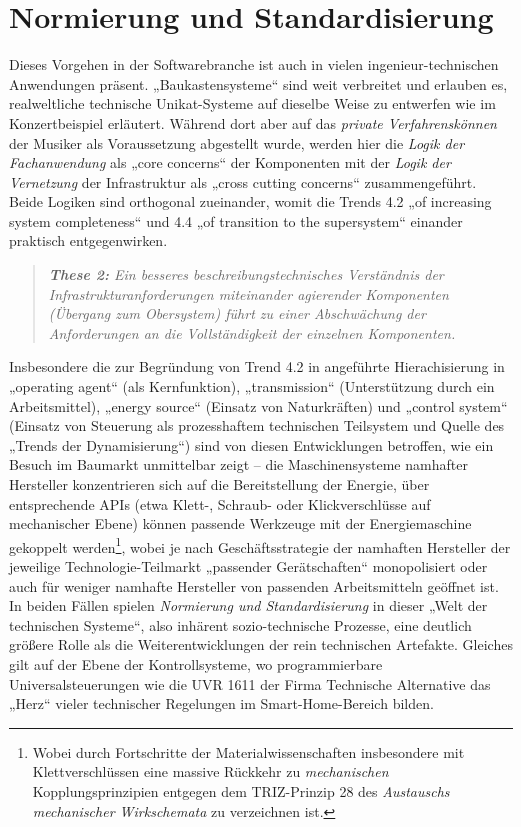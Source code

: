 \documentclass[11pt,a4paper]{article}
\begin{document}
\section{Normierung und Standardisierung}

Dieses Vorgehen in der Softwarebranche ist auch in vielen
ingenieur-technischen Anwendungen präsent. „Baukastensysteme“ sind weit
verbreitet und erlauben es, realweltliche technische Unikat-Systeme auf
dieselbe Weise zu entwerfen wie im Konzertbeispiel erläutert. Während dort
aber auf das \emph{private Verfahrenskönnen} der Musiker als Voraussetzung
abgestellt wurde, werden hier die \emph{Logik der Fachanwendung} als „core
concerns“ der Komponenten mit der \emph{Logik der Vernetzung} der
Infrastruktur als „cross cutting concerns“ zusammengeführt. Beide Logiken sind
orthogonal zueinander, womit die Trends 4.2 „of increasing system
completeness“ und 4.4 „of transition to the supersystem“ einander praktisch
entgegenwirken. 
\begin{quote}\it 
  \textbf{These 2:} Ein besseres beschreibungstechnisches Verständnis der
  Infrastrukturanforderungen miteinander agierender Komponenten (Übergang zum
  Obersystem) führt zu einer \emph{Abschwächung} der Anforderungen an die
  Vollständigkeit der einzelnen Komponenten.
\end{quote}
Insbesondere die zur Begründung von Trend 4.2 in \cite{TESE2018} angeführte
Hierachisierung in „operating agent“ (als Kernfunktion), „transmission“
(Unterstützung durch ein Arbeitsmittel), „energy source“ (Einsatz von
Naturkräften) und „control system“ (Einsatz von Steuerung als prozesshaftem
technischen Teilsystem und Quelle des „Trends der Dynamisierung“) sind von
diesen Entwicklungen betroffen, wie ein Besuch im Baumarkt unmittelbar zeigt
-- die Maschinensysteme namhafter Hersteller konzentrieren sich auf die
Bereitstellung der Energie, über entsprechende APIs (etwa Klett-, Schraub-
oder Klickverschlüsse auf mechanischer Ebene) können passende Werkzeuge mit
der Energiemaschine gekoppelt werden\footnote{Wobei durch Fortschritte der
  Materialwissenschaften insbesondere mit Klettverschlüssen eine massive
  Rückkehr zu \emph{mechanischen} Kopplungsprinzipien entgegen dem
  TRIZ-Prinzip 28 des \emph{Austauschs mechanischer Wirkschemata} zu
  verzeichnen ist.}, wobei je nach Geschäftsstrategie der namhaften Hersteller
der jeweilige Technologie-Teilmarkt „passender Gerätschaften“ monopolisiert
oder auch für weniger namhafte Hersteller von passenden Arbeitsmitteln
geöffnet ist. In beiden Fällen spielen \emph{Normierung und Standardisierung}
in dieser „Welt der technischen Systeme“, also inhärent sozio-technische
Prozesse, eine deutlich größere Rolle als die Weiterentwicklungen der rein
technischen Artefakte. Gleiches gilt auf der Ebene der Kontrollsysteme, wo
programmierbare Universalsteuerungen wie die UVR 1611 der Firma Technische
Alternative das „Herz“ vieler technischer Regelungen im Smart-Home-Bereich
bilden.
\end{document}
